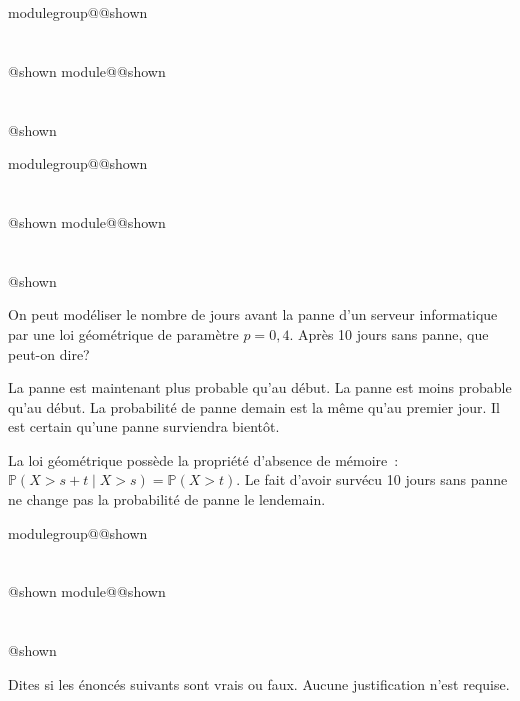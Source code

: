 \documentclass{Evaluation}
\makeatletter
\newcommand{\currentmodulekey}{}
\newcommand{\currentmoduletitle}{}
\newcommand{\currentgroupkey}{}
\newcommand{\currentgrouptitle}{}
\newcommand{\showmoduleifneeded}{%
  \ifx\currentgroupkey\empty\else
    \expandafter\ifx\csname modulegroup@\currentgroupkey @shown\endcsname\relax
      \section*{\currentgrouptitle}%
      \expandafter\gdef\csname modulegroup@\currentgroupkey @shown\endcsname{1}%
    \fi
  \fi
  \expandafter\ifx\csname module@\currentmodulekey @shown\endcsname\relax
    \section*{\currentmoduletitle}%
    \expandafter\gdef\csname module@\currentmodulekey @shown\endcsname{1}%
  \fi
}
\newenvironment{H26}{\showmoduleifneeded}{}
\newenvironment{H26r}{\showmoduleifneeded}{}
\makeatother
\begin{document}
\begin{questions}
\begin{H26}
\end{H26}

\begin{H26r}
\question {} %

On peut modéliser le nombre de jours avant la panne d'un serveur informatique par une loi géométrique de paramètre $p=0{,}4$. Après 10 jours sans panne, que peut-on dire?

\begin{checkboxes}
\choice La panne est maintenant plus probable qu'au début.
\choice La panne est moins probable qu'au début.
\correctchoice La probabilité de panne demain est la même qu'au premier jour.
\choice Il est certain qu'une panne surviendra bientôt.
\end{checkboxes}
\begin{solution}
La loi géométrique possède la propriété d'absence de mémoire~: $\mathbb{P}(X > s+t \mid X > s) = \mathbb{P}(X > t)$. Le fait d'avoir survécu 10 jours sans panne ne change pas la probabilité de panne le lendemain.
\end{solution}
\end{H26r}

\begin{H26r}
\question {} %
Dites si les énoncés suivants sont vrais ou faux. Aucune justification n'est requise.


\end{H26r}
\end{questions}
\end{document}
